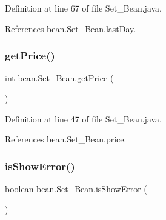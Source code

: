 Definition at line 67 of file Set\+\_\+\+Bean.\+java.


\begin{DoxyCode}{0}

\end{DoxyCode}


References bean.\+Set\+\_\+\+Bean.\+last\+Day.

\mbox{\label{classbean_1_1Set__Bean_a336e607ada67dc0cbea19914fd8a93b0}} 
\subsubsection{\texorpdfstring{getPrice()}{getPrice()}}
{\footnotesize\ttfamily int bean.\+Set\+\_\+\+Bean.\+get\+Price (\begin{DoxyParamCaption}{ }\end{DoxyParamCaption})}



Definition at line 47 of file Set\+\_\+\+Bean.\+java.


\begin{DoxyCode}{0}

\end{DoxyCode}


References bean.\+Set\+\_\+\+Bean.\+price.

\mbox{\label{classbean_1_1Set__Bean_a84574fb21d6564cf7af43ebaa4cf8342}} 
\subsubsection{\texorpdfstring{isShowError()}{isShowError()}}
{\footnotesize\ttfamily boolean bean.\+Set\+\_\+\+Bean.\+is\+Show\+Error (\begin{DoxyParamCaption}{ }\end{DoxyParamCaption})}



